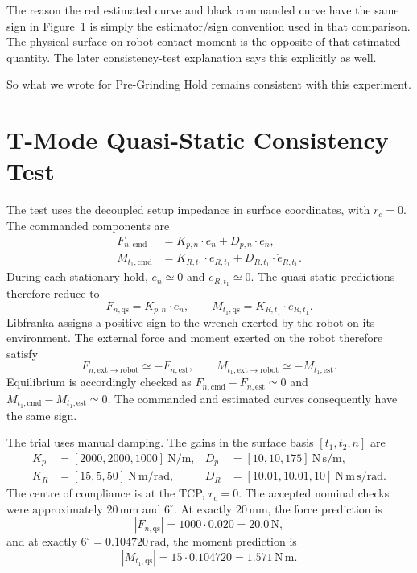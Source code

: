 \documentclass[11pt,a4paper]{article}
\begin{document}
The reason the red estimated curve and black commanded curve have the same sign
in Figure~1 is simply the estimator/sign convention used in that comparison.
The physical surface-on-robot contact moment is the opposite of that estimated
quantity.  The later consistency-test explanation says this explicitly as well.

So what we wrote for Pre-Grinding Hold remains consistent with this experiment.

\clearpage
\section*{T-Mode Quasi-Static Consistency Test}

The test uses the decoupled setup impedance in surface coordinates, with
\(r_c=0\).  The commanded components are
\begin{align*}
 F_{n,\mathrm{cmd}} &= K_{p,n}\mathbin{\cdot}e_n
                       +D_{p,n}\mathbin{\cdot}\dot e_n,\\
 M_{t_1,\mathrm{cmd}} &= K_{R,t_1}\mathbin{\cdot}e_{R,t_1}
                         +D_{R,t_1}\mathbin{\cdot}\dot e_{R,t_1}.
\end{align*}
During each stationary hold, \(\dot e_n\simeq0\) and
\(\dot e_{R,t_1}\simeq0\).  The quasi-static predictions therefore reduce to
\[
 F_{n,\mathrm{qs}}=K_{p,n}\mathbin{\cdot}e_n,
 \qquad
 M_{t_1,\mathrm{qs}}=K_{R,t_1}\mathbin{\cdot}e_{R,t_1}.
\]
Libfranka assigns a positive sign to the wrench exerted by the robot on its
environment.  The external force and moment exerted on the robot therefore
satisfy
\[
 F_{n,\mathrm{ext\to robot}}\simeq-F_{n,\mathrm{est}},
 \qquad
 M_{t_1,\mathrm{ext\to robot}}\simeq-M_{t_1,\mathrm{est}}.
\]
Equilibrium is accordingly checked as
\(F_{n,\mathrm{cmd}}-F_{n,\mathrm{est}}\simeq0\) and
\(M_{t_1,\mathrm{cmd}}-M_{t_1,\mathrm{est}}\simeq0\).  The commanded and
estimated curves consequently have the same sign.

The trial uses manual damping.  The gains in the surface basis
\([t_1,t_2,n]\) are
\begin{align*}
 K_p&=[2000,2000,1000]~\mathrm{N/m}, &
 D_p&=[10,10,175]~\mathrm{N\,s/m},\\
 K_R&=[15,5,50]~\mathrm{N\,m/rad}, &
 D_R&=[10.01,10.01,10]~\mathrm{N\,m\,s/rad}.
\end{align*}
The centre of compliance is at the TCP, \(r_c=0\).
The accepted nominal checks were approximately \(20\,\mathrm{mm}\) and
\(6^\circ\).  At exactly \(20\,\mathrm{mm}\), the force prediction is
\[
 |F_{n,\mathrm{qs}}|=1000\mathbin{\cdot}0.020=20.0\,\mathrm{N},
\]
and at exactly \(6^\circ=0.104720\,\mathrm{rad}\), the moment prediction is
\[
 |M_{t_1,\mathrm{qs}}|=15\mathbin{\cdot}0.104720=1.571\,\mathrm{N\,m}.
\]
\end{document}
